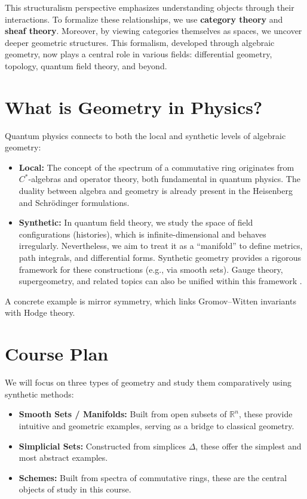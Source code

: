 This structuralism perspective emphasizes understanding objects through their interactions. To formalize these relationships, we use \textbf{category theory} and \textbf{sheaf theory}. Moreover, by viewing categories themselves as spaces, we uncover deeper geometric structures. This formalism, developed through algebraic geometry, now plays a central role in various fields: differential geometry, topology, quantum field theory, and beyond.

\section{What is Geometry in Physics?}

Quantum physics connects to both the local and synthetic levels of algebraic geometry:

\begin{itemize}
  \item \textbf{Local:} The concept of the spectrum of a commutative ring originates from $C^*$-algebras and operator theory, both fundamental in quantum physics. The duality between algebra and geometry is already present in the Heisenberg and Schrödinger formulations.

  \item \textbf{Synthetic:} In quantum field theory, we study the space of field configurations (histories), which is infinite-dimensional and behaves irregularly. Nevertheless, we aim to treat it as a “manifold” to define metrics, path integrals, and differential forms. Synthetic geometry provides a rigorous framework for these constructions (e.g., via smooth sets). Gauge theory, supergeometry, and related topics can also be unified within this framework \cite{nlab:geometry_of_physics}.
\end{itemize}

A concrete example is mirror symmetry, which links Gromov–Witten invariants with Hodge theory.

\section{Course Plan}

We will focus on three types of geometry and study them comparatively using synthetic methods:

\begin{itemize}
  \item \textbf{Smooth Sets / Manifolds:} Built from open subsets of $\mathbb{R}^n$, these provide intuitive and geometric examples, serving as a bridge to classical geometry.

  \item \textbf{Simplicial Sets:} Constructed from simplices $\Delta$, these offer the simplest and most abstract examples.

  \item \textbf{Schemes:} Built from spectra of commutative rings, these are the central objects of study in this course.
\end{itemize}
